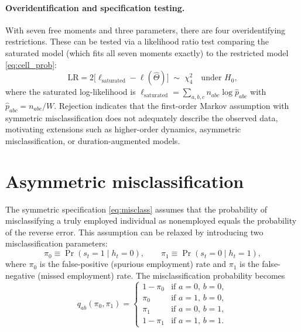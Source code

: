 \documentclass[12pt]{article}
\begin{document}
\paragraph{Overidentification and specification testing.}
With seven free moments and three parameters, there are four
overidentifying restrictions. These can be tested via a likelihood ratio
test comparing the saturated model (which fits all seven moments
exactly) to the restricted model \eqref{eq:cell_prob}:
\begin{equation}
\mathrm{LR} = 2\big[\ell_{\text{saturated}} - \ell(\hat\Theta)\big]
\;\sim\; \chi^2_4 \quad \text{under } H_0,
\label{eq:overid_test}
\end{equation}
where the saturated log-likelihood is
\(\ell_{\text{saturated}} = \sum_{a,b,c} n_{abc} \log \hat{p}_{abc}\)
with \(\hat{p}_{abc} = n_{abc}/W\). Rejection indicates that the
first-order Markov assumption with symmetric misclassification does not
adequately describe the observed data, motivating extensions such as
higher-order dynamics, asymmetric misclassification, or duration-augmented
models.

\section{Asymmetric misclassification}
\label{sec:asymmetric}

The symmetric specification \eqref{eq:misclass} assumes that the
probability of misclassifying a truly employed individual as nonemployed
equals the probability of the reverse error. This assumption can be
relaxed by introducing two misclassification parameters:
\begin{equation}
\pi_0 \equiv \Pr(s_t = 1 \mid h_t = 0), \qquad
\pi_1 \equiv \Pr(s_t = 0 \mid h_t = 1),
\label{eq:asymmetric_pi}
\end{equation}
where \(\pi_0\) is the false-positive (spurious employment) rate and
\(\pi_1\) is the false-negative (missed employment) rate. The
misclassification probability becomes
\[
q_{ab}(\pi_0, \pi_1) =
\begin{cases}
1 - \pi_0 & \text{if } a = 0,\, b = 0, \\
\pi_0     & \text{if } a = 1,\, b = 0, \\
\pi_1     & \text{if } a = 0,\, b = 1, \\
1 - \pi_1 & \text{if } a = 1,\, b = 1.
\end{cases}
\]
\end{document}
